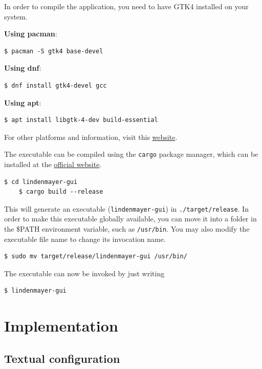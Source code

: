 \documentclass[a4paper]{article}
\begin{document}
In order to compile the application, you need to have GTK4 installed on your system.

\textbf{Using pacman}:
\begin{lstlisting}[style=boxed]
    $ pacman -S gtk4 base-devel
\end{lstlisting}

\textbf{Using dnf}:
\begin{lstlisting}[style=boxed]
    $ dnf install gtk4-devel gcc
\end{lstlisting}

\textbf{Using apt}:
\begin{lstlisting}[style=boxed]
    $ apt install libgtk-4-dev build-essential
\end{lstlisting}

For other platforms and information, visit this \href{https://gtk-rs.org/gtk4-rs/git/book/installation.html}{website}\cite{gtkinstallation}.

The executable can be compiled using the \texttt{\gls{cargo}}
package manager, which can be installed at the
\href{https://www.rust-lang.org/tools/install}{official website}\cite{rustinstall}.

\begin{lstlisting}[style=boxed]
    $ cd lindenmayer-gui
    $ cargo build --release
\end{lstlisting}

This will generate an executable (\texttt{lindenmayer-gui})
in \texttt{./target/release}.
In order to make this executable globally available,
you can move it into a folder in the \textsc{\$PATH} environment
variable, such as \texttt{/usr/bin}.
You may also modify the executable file name to change its invocation
name.

\begin{lstlisting}[style=boxed]
    $ sudo mv target/release/lindenmayer-gui /usr/bin/
\end{lstlisting}

The executable can now be invoked by just writing
\begin{lstlisting}[style=boxed]
    $ lindenmayer-gui
\end{lstlisting}

\pagebreak

\section{Implementation}

\subsection{Textual configuration}
\end{document}
